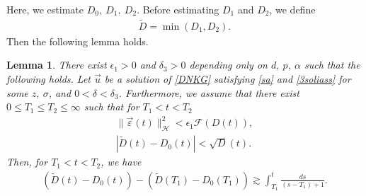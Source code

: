 \documentclass[reqno]{amsart}
\theoremstyle{plain}
\newtheorem{lemma}[theorem]{Lemma}
\theoremstyle{definition}
\numberwithin{equation}{section}
\newcommand{\1}{\mathbbm{1}}
\begin{document}
Here, we estimate $D_0,\ D_1,\ D_2$. Before estimating $D_1$ and $D_2$, we define
\begin{align}
\tilde{D}=\min{(D_1,D_2)}.
\end{align}
Then the following lemma holds.





\begin{lemma}\label{dtildes}
There exist $\epsilon_1>0$ and $\delta_3>0$ depending only on $d,\ p,\ \alpha$ such that the following holds. Let $\vec{u}$ be a solution of \eqref{DNKG} satisfying \eqref{sa} and \eqref{3soliass} for some $z,\ \sigma$, and $0<\delta<\delta_3$. Furthermore, we assume that there exist $0\leq T_1\leq T_2\leq \infty$ such that for $T_1<t<T_2$ 
\begin{align}
\|\vec{\varepsilon}(t)\|_{\mathcal{H}}^2<\epsilon_1 \mathcal{F}(D(t)), \label{varepes1}
\\
|\tilde{D}(t)-D_0(t)|<\sqrt{D}(t).\label{Dass}
\end{align}
Then, for $T_1<t<T_2$, we have
\begin{align}\label{Dest}
\left( \tilde{D}(t)-D_0(t)\right)-\left( \tilde{D}(T_1)-D_0(T_1)\right)\gtrsim \int_{T_1}^t \frac{ds}{(s-T_1)+1}.
\end{align}
\end{lemma}
\end{document}
